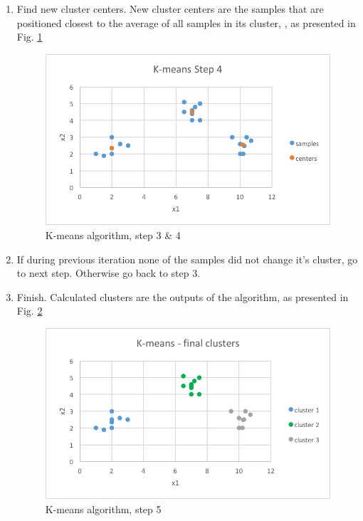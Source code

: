 \begin{enumerate}
	\item Find new cluster centers. New cluster centers are the samples that are positioned closest to the average of all samples in its cluster, , as presented in Fig. \ref{kmeans_s4}
	\begin{figure}[H]
	\begin{center}
	\includegraphics[width=0.8\linewidth]{images/kmeans4.png}
	\caption{K-means algorithm, step 3 \& 4}
	\label{kmeans_s4}
	\end{center}
	\end{figure}
	
	\item If during previous iteration none of the samples did not change it's cluster, go to next step. Otherwise go back to step 3.
	
	\item Finish. Calculated clusters are the outputs of the algorithm, as presented in Fig. \ref{kmeans_s5}
	\begin{figure}[H]
	\begin{center}
	\includegraphics[width=0.8\linewidth]{images/kmeans5.png}
	\caption{K-means algorithm, step 5}
	\label{kmeans_s5}
	\end{center}
	\end{figure}
	
	\end{enumerate}
	
